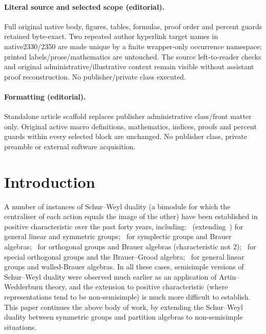 \documentclass[10pt]{article}
\theoremstyle{definition}
\begin{document}
\paragraph{Literal source and selected scope (editorial).} Full original native body, figures, tables, formulas, proof order and percent guards retained byte-exact. Two repeated author hyperlink target names in native2330/2350 are made unique by a finite wrapper-only occurrence namespace; printed labels/prose/mathematics are untouched. The source left-to-reader checks and original administrative/illustrative context remain visible without assistant proof reconstruction. No publisher/private class executed.
\paragraph{Formatting (editorial).} Standalone article scaffold replaces publisher administrative class/front matter only. Original active macro definitions, mathematics, indices, proofs and percent guards within every selected block are unchanged. No publisher class, private preamble or external software acquisition.
\clearpage
\newtheorem{property}{Property} %


\relax%

\section*{Introduction}%
A number of instances of Schur--Weyl duality (a bimodule for which the
centraliser of each action equals the image of the other) have been
established in positive characteristic over the past forty years,
including:~\cite{Benson-Doty} (extending~\cite{Carter-Lusztig, dCP,
 Green:book}) for general linear and symmetric groups;~\cite{DDH} for
symplectic groups and Brauer algebras;~\cite{DH} for orthogonal groups
and Brauer algebras (characteristic not 2);~\cite{Garge-Nebhani} for
special orthogonal groups and the Brauer--Grood algebra;~\cite{DDS1,
 DDS2, DD, Donkin} for general linear groups and walled-Brauer
algebras. In all these cases, semisimple versions of Schur--Weyl
duality were observed much earlier as an application of
Artin--Wedderburn theory, and the extension to positive characteristic
(where representations tend to be non-semisimple) is much more
difficult to establish. This paper continues the above body of work, by
extending the Schur--Weyl duality between symmetric groups and
partition algebras to non-semisimple situations.
\end{document}
